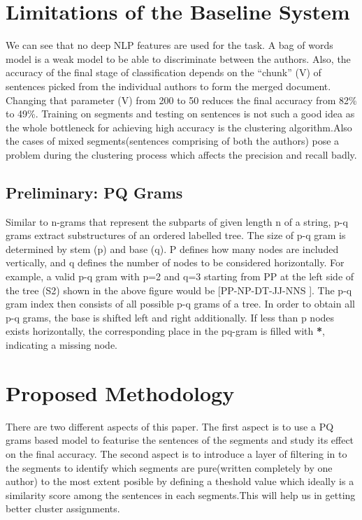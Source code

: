 \documentclass[letterpaper]{article}
\begin{document}
\begin{figure}

\end{figure}

\section{Limitations of the Baseline System}
We can see that no deep NLP features are used for the task. A bag of words model is a weak model to be able to discriminate between the authors. Also, the accuracy of the final stage of classification depends on the “chunk” (V) of sentences picked from the individual authors to form the merged document. Changing that parameter (V) from 200 to 50 reduces the final accuracy from 82\% to 49\%. Training on segments and testing on sentences is not such a good idea as the whole bottleneck for achieving high accuracy is the clustering algorithm.Also the cases of mixed segments(sentences comprising of both the authors) pose a problem during the clustering process which affects the precision and recall badly.
\subsection{Preliminary: PQ Grams}
Similar to n-grams that represent the subparts of given length n of a string, p-q grams extract substructures of an ordered labelled tree. The size of p-q gram is determined by stem (p) and base (q). P defines how many nodes are included vertically, and q defines the number of nodes to be considered horizontally. For example, a valid p-q gram with p=2 and q=3 starting from PP at the left side of the tree (S2) shown in the above figure would be [PP-NP-DT-JJ-NNS ]. The p-q gram index then consists of all possible p-q grams of a tree. In order to obtain all p-q grams, the base is shifted left and right additionally. If less than p nodes exists horizontally, the corresponding place in the pq-gram is filled with \textbf{*}, indicating a missing node.\\

\section{Proposed Methodology}
There are two different aspects of this paper. The first aspect is to use a PQ grams based model to featurise the sentences of the segments and study its effect on the final accuracy. The second aspect is to  introduce a layer of filtering in to the segments to identify which segments are pure(written completely by one author) to the most extent posible by defining a theshold value which ideally is a similarity score among the sentences in each segments.This will help us in getting better cluster assignments.\\
\end{document}
